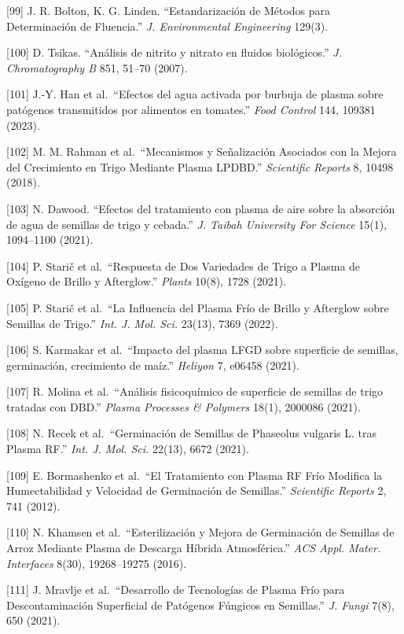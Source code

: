 \documentclass[
]{article}
\begin{document}
{[}99{]} J. R. Bolton, K. G. Linden. ``Estandarización de Métodos para
Determinación de Fluencia.'' \emph{J. Environmental Engineering} 129(3).

{[}100{]} D. Tsikas. ``Análisis de nitrito y nitrato en fluidos
biológicos.'' \emph{J. Chromatography B} 851, 51--70 (2007).

{[}101{]} J.-Y. Han et al.~``Efectos del agua activada por burbuja de
plasma sobre patógenos transmitidos por alimentos en tomates.''
\emph{Food Control} 144, 109381 (2023).

{[}102{]} M. M. Rahman et al.~``Mecanismos y Señalización Asociados con
la Mejora del Crecimiento en Trigo Mediante Plasma LPDBD.''
\emph{Scientific Reports} 8, 10498 (2018).

{[}103{]} N. Dawood. ``Efectos del tratamiento con plasma de aire sobre
la absorción de agua de semillas de trigo y cebada.'' \emph{J. Taibah
University For Science} 15(1), 1094--1100 (2021).

{[}104{]} P. Starič et al.~``Respuesta de Dos Variedades de Trigo a
Plasma de Oxígeno de Brillo y Afterglow.'' \emph{Plants} 10(8), 1728
(2021).

{[}105{]} P. Starič et al.~``La Influencia del Plasma Frío de Brillo y
Afterglow sobre Semillas de Trigo.'' \emph{Int. J. Mol. Sci.} 23(13),
7369 (2022).

{[}106{]} S. Karmakar et al.~``Impacto del plasma LFGD sobre superficie
de semillas, germinación, crecimiento de maíz.'' \emph{Heliyon} 7,
e06458 (2021).

{[}107{]} R. Molina et al.~``Análisis fisicoquímico de superficie de
semillas de trigo tratadas con DBD.'' \emph{Plasma Processes \&
Polymers} 18(1), 2000086 (2021).

{[}108{]} N. Recek et al.~``Germinación de Semillas de Phaseolus
vulgaris L. tras Plasma RF.'' \emph{Int. J. Mol. Sci.} 22(13), 6672
(2021).

{[}109{]} E. Bormashenko et al.~``El Tratamiento con Plasma RF Frío
Modifica la Humectabilidad y Velocidad de Germinación de Semillas.''
\emph{Scientific Reports} 2, 741 (2012).

{[}110{]} N. Khamsen et al.~``Esterilización y Mejora de Germinación de
Semillas de Arroz Mediante Plasma de Descarga Híbrida Atmosférica.''
\emph{ACS Appl. Mater. Interfaces} 8(30), 19268--19275 (2016).

{[}111{]} J. Mravlje et al.~``Desarrollo de Tecnologías de Plasma Frío
para Descontaminación Superficial de Patógenos Fúngicos en Semillas.''
\emph{J. Fungi} 7(8), 650 (2021).
\end{document}
